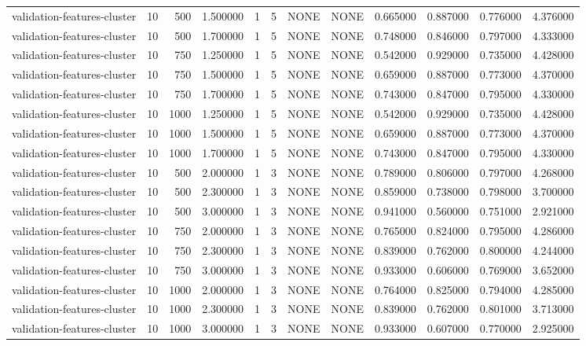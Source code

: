 \begin{tabular}{lrrrllllrrrr}
validation-features-cluster & 10 & 500 & 1.500000 & 1 & 5 & NONE & NONE & 0.665000 & 0.887000 & 0.776000 & 4.376000 \\
validation-features-cluster & 10 & 500 & 1.700000 & 1 & 5 & NONE & NONE & 0.748000 & 0.846000 & 0.797000 & 4.333000 \\
validation-features-cluster & 10 & 750 & 1.250000 & 1 & 5 & NONE & NONE & 0.542000 & 0.929000 & 0.735000 & 4.428000 \\
validation-features-cluster & 10 & 750 & 1.500000 & 1 & 5 & NONE & NONE & 0.659000 & 0.887000 & 0.773000 & 4.370000 \\
validation-features-cluster & 10 & 750 & 1.700000 & 1 & 5 & NONE & NONE & 0.743000 & 0.847000 & 0.795000 & 4.330000 \\
validation-features-cluster & 10 & 1000 & 1.250000 & 1 & 5 & NONE & NONE & 0.542000 & 0.929000 & 0.735000 & 4.428000 \\
validation-features-cluster & 10 & 1000 & 1.500000 & 1 & 5 & NONE & NONE & 0.659000 & 0.887000 & 0.773000 & 4.370000 \\
validation-features-cluster & 10 & 1000 & 1.700000 & 1 & 5 & NONE & NONE & 0.743000 & 0.847000 & 0.795000 & 4.330000 \\
validation-features-cluster & 10 & 500 & 2.000000 & 1 & 3 & NONE & NONE & 0.789000 & 0.806000 & 0.797000 & 4.268000 \\
validation-features-cluster & 10 & 500 & 2.300000 & 1 & 3 & NONE & NONE & 0.859000 & 0.738000 & 0.798000 & 3.700000 \\
validation-features-cluster & 10 & 500 & 3.000000 & 1 & 3 & NONE & NONE & 0.941000 & 0.560000 & 0.751000 & 2.921000 \\
validation-features-cluster & 10 & 750 & 2.000000 & 1 & 3 & NONE & NONE & 0.765000 & 0.824000 & 0.795000 & 4.286000 \\
validation-features-cluster & 10 & 750 & 2.300000 & 1 & 3 & NONE & NONE & 0.839000 & 0.762000 & 0.800000 & 4.244000 \\
validation-features-cluster & 10 & 750 & 3.000000 & 1 & 3 & NONE & NONE & 0.933000 & 0.606000 & 0.769000 & 3.652000 \\
validation-features-cluster & 10 & 1000 & 2.000000 & 1 & 3 & NONE & NONE & 0.764000 & 0.825000 & 0.794000 & 4.285000 \\
validation-features-cluster & 10 & 1000 & 2.300000 & 1 & 3 & NONE & NONE & 0.839000 & 0.762000 & 0.801000 & 3.713000 \\
validation-features-cluster & 10 & 1000 & 3.000000 & 1 & 3 & NONE & NONE & 0.933000 & 0.607000 & 0.770000 & 2.925000 \\

\end{tabular}

